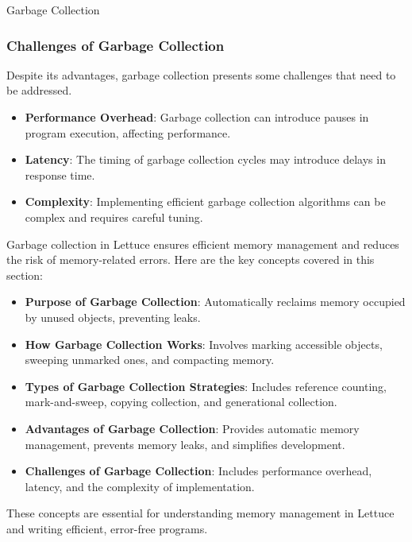\begin{notes}{Garbage Collection}
\begin{highlight}
    \end{highlight}
    
    \subsubsection*{Challenges of Garbage Collection}
    
    Despite its advantages, garbage collection presents some challenges that need to be addressed.
    
    \begin{highlight}
    
        \begin{itemize}
            \item \textbf{Performance Overhead}: Garbage collection can introduce pauses in program execution, affecting performance.
            \item \textbf{Latency}: The timing of garbage collection cycles may introduce delays in response time.
            \item \textbf{Complexity}: Implementing efficient garbage collection algorithms can be complex and requires careful tuning.
        \end{itemize}
    
    \end{highlight}
    
    \begin{highlight}
    
        Garbage collection in Lettuce ensures efficient memory management and reduces the risk of memory-related errors. Here are the key concepts covered in this section:
    
        \begin{itemize}
            \item \textbf{Purpose of Garbage Collection}: Automatically reclaims memory occupied by unused objects, preventing leaks.
            \item \textbf{How Garbage Collection Works}: Involves marking accessible objects, sweeping unmarked ones, and compacting memory.
            \item \textbf{Types of Garbage Collection Strategies}: Includes reference counting, mark-and-sweep, copying collection, and generational collection.
            \item \textbf{Advantages of Garbage Collection}: Provides automatic memory management, prevents memory leaks, and simplifies development.
            \item \textbf{Challenges of Garbage Collection}: Includes performance overhead, latency, and the complexity of implementation.
        \end{itemize}
    
        These concepts are essential for understanding memory management in Lettuce and writing efficient, error-free programs.
    
    \end{highlight}
\end{notes}